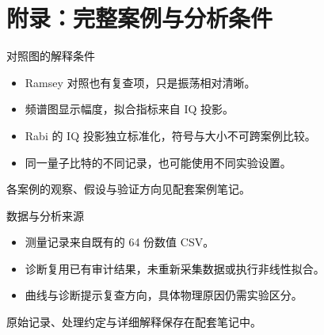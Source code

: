 \documentclass[aspectratio=169,12pt,fontset=none]{ctexbeamer}
\newcommand{\src}[1]{\vfill{\fontsize{9}{11}\selectfont\color{Muted}#1\par}}
\begin{document}
\section[附录案例]{附录：完整案例与分析条件}

\begin{frame}{对照图的解释条件}
 \begin{itemize}
  \item Ramsey 对照也有复查项，只是振荡相对清晰。
  \item 频谱图显示幅度，拟合指标来自 IQ 投影。
  \item Rabi 的 IQ 投影独立标准化，符号与大小不可跨案例比较。
  \item 同一量子比特的不同记录，也可能使用不同实验设置。
 \end{itemize}
 \src{各案例的观察、假设与验证方向见配套案例笔记。}
\end{frame}
\begin{frame}{数据与分析来源}
 \begin{itemize}
  \item 测量记录来自既有的 64 份数值 CSV。
  \item 诊断复用已有审计结果，未重新采集数据或执行非线性拟合。
  \item 曲线与诊断提示复查方向，具体物理原因仍需实验区分。
 \end{itemize}
 \vspace{4mm}\par
 原始记录、处理约定与详细解释保存在配套笔记中。
\end{frame}

\end{document}
